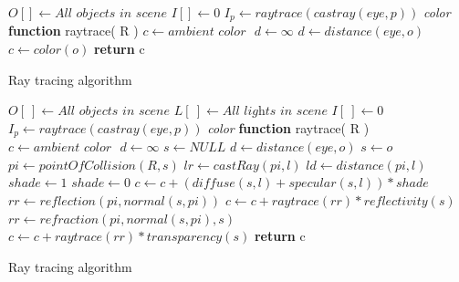 \documentclass[12pt,a4paper,oneside]{article}
\begin{document}
\begin{algorithm}[H]
\begin{algorithmic}[1]
\STATE $O[ ] \gets \textit{All objects in scene}$ 
\STATE $I[] \gets 0$ 
\STATE
{}
	\STATE $I_{p} \gets raytrace( castray( eye, p ))$
\ENDFOR
\STATE 
\STATE \textit{color} \textbf{function} raytrace(  R )
	\STATE $c  \gets \textit{ambient color } $
	\STATE $d \gets \infty $
				\STATE $d \gets distance( \textit{eye}, o )$
				\STATE $c \gets color( o )$
			\ENDIF
		\ENDIF
	\ENDFOR
	\STATE \textbf{return} c

\end{algorithmic}
\caption{Ray tracing algorithm}
\label{ray-trace}
\end{algorithm}

  

\begin{algorithm}[H]
\begin{algorithmic}[1]
\STATE $O[\ ] \gets \textit{All objects in scene}$ 
\STATE $L[\ ] \gets \textit{All lights in scene}$
\STATE $I[\ ] \gets 0$ 
\STATE
{}
	\STATE $I_{p} \gets raytrace( castray( eye, p ))$
\ENDFOR
\STATE 
\STATE \textit{color} \textbf{function} raytrace(  R )
	\STATE $c  \gets \textit{ambient color } $
	\STATE $d \gets \infty $
	\STATE $s \gets \textit{NULL}$
				\STATE $d \gets distance( \textit{eye}, o )$
				\STATE $s \gets o$
			\ENDIF
		\ENDIF
	\ENDFOR
		\STATE {}
		\STATE $pi \gets pointOfCollision( R, s )$
			\STATE $lr \gets castRay( pi, l )$
			\STATE $ld \gets distance( pi, l )$
			\STATE $shade \gets 1$
					\STATE $shade \gets 0$				
				\ENDIF
				\STATE $c \gets c +( diffuse( s, l ) + specular( s, l )) * shade$ 
			\ENDFOR
		\ENDFOR
		\STATE {}
			\STATE $rr \gets reflection( pi, normal( s, pi ))$
			\STATE $c \gets c + raytrace( rr ) * reflectivity( s )$
		\ENDIF
		\STATE {}
			\STATE $rr \gets refraction( pi, normal( s, pi ), s )$
			\STATE $c \gets c + raytrace( rr ) * transparency( s )$
		\ENDIF
	\ENDIF
	\STATE \textbf{return} c

\end{algorithmic}
\caption{Ray tracing algorithm}
\label{ray-trace-full}
\end{algorithm}



\newpage
\listofalgorithms
\listoffigures
\listoftables


\end{document}
